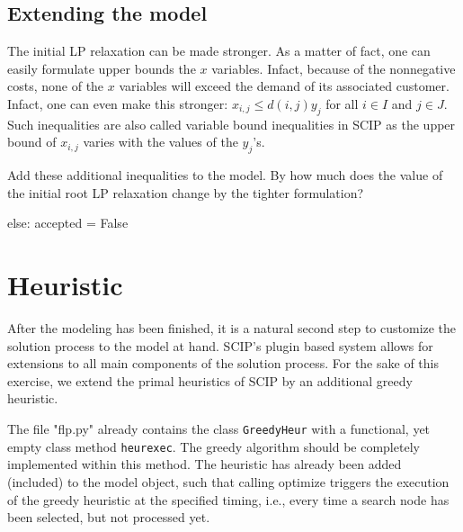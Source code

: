 \documentclass[a4paper,10pt]{article}
\begin{document}
\subsection{Extending the model}

The initial LP relaxation can be made stronger. As a matter of fact, one can easily formulate upper bounds the $x$ variables. Infact, because of the nonnegative costs, none of the $x$ variables will exceed the demand of its associated customer. Infact, one can even make this stronger: $x_{i,j} \leq d(i,j) y_{j}$ for all $i \in I$ and $j \in J$. Such inequalities are also called variable bound inequalities in SCIP as the upper bound of $x_{i,j}$ varies with the values of the $y_{j}$'s.

Add these additional inequalities to the model. By how much does the value of the initial root LP relaxation
change by the tighter formulation?

else:
            accepted = False

\section{Heuristic}

After the modeling has been finished, it is a natural second step to 
customize the solution process to the model at hand.
SCIP's plugin based system allows for extensions to all main components
of the solution process.
For the sake of this exercise, we extend the primal heuristics of
SCIP by an additional greedy heuristic.

The file "flp.py" already contains the class
\texttt{GreedyHeur} with a functional, yet 
empty class method \texttt{heurexec}.
The greedy algorithm should be completely implemented within this method.
The heuristic has already been added (included) to the model
object, such that calling optimize triggers the 
execution of the greedy heuristic at the specified timing,
i.e., every time a search node has been selected, but not processed yet.
\end{document}
